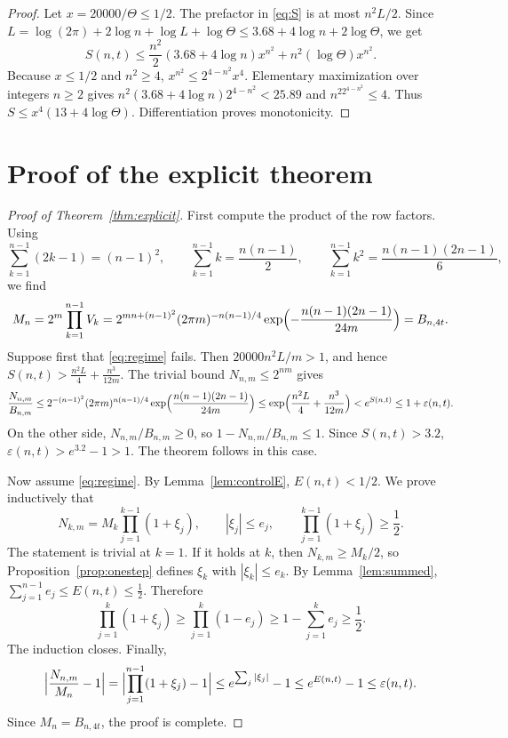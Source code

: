 \documentclass[11pt,reqno]{amsart}
\theoremstyle{plain}
\theoremstyle{definition}
\theoremstyle{remark}
\begin{document}
\begin{proof}
Let \(x=20000/\Theta\le1/2\). The prefactor in \eqref{eq:S} is at most
\(n^2L/2\). Since
\(L=\log(2\pi)+2\log n+\log L+\log\Theta\le3.68+4\log n+2\log\Theta\), we get
\[
  S(n,t)\le\frac{n^2}2(3.68+4\log n)x^{n^2}+n^2(\log\Theta)x^{n^2}.
\]
Because \(x\le1/2\) and \(n^2\ge4\), \(x^{n^2}\le2^{4-n^2}x^4\). Elementary
maximization over integers \(n\ge2\) gives
\(n^2(3.68+4\log n)2^{4-n^2}<25.89\) and \(n^22^{4-n^2}\le4\). Thus
\(S\le x^4(13+4\log\Theta)\). Differentiation proves monotonicity.
\end{proof}

\section{Proof of the explicit theorem}

\begin{proof}[Proof of Theorem~\ref{thm:explicit}]
First compute the product of the row factors. Using
\[
  \sum_{k=1}^{n-1}(2k-1)=(n-1)^2,\qquad
  \sum_{k=1}^{n-1}k=\frac{n(n-1)}2,\qquad
  \sum_{k=1}^{n-1}k^2=\frac{n(n-1)(2n-1)}6,
\]
we find
\[
  M_n=2^m\prod_{k=1}^{n-1}V_k
  =2^{mn+(n-1)^2}(2\pi m)^{-n(n-1)/4}
    \exp\Bigl(-\frac{n(n-1)(2n-1)}{24m}\Bigr)=B_{n,4t}.
\]
Suppose first that \eqref{eq:regime} fails. Then \(20000n^2L/m>1\), and hence
\(S(n,t)>\tfrac{n^2L}4+\tfrac{n^3}{12m}\). The trivial bound
\(N_{n,m}\le2^{nm}\) gives
\[
  \frac{N_{n,m}}{B_{n,m}}\le2^{-(n-1)^2}(2\pi m)^{n(n-1)/4}
    \exp\Bigl(\frac{n(n-1)(2n-1)}{24m}\Bigr)
  \le\exp\Bigl(\frac{n^2L}4+\frac{n^3}{12m}\Bigr)<e^{S(n,t)}
  \le1+\varepsilon(n,t).
\]
On the other side, \(N_{n,m}/B_{n,m}\ge0\), so
\(1-N_{n,m}/B_{n,m}\le1\). Since \(S(n,t)>3.2\),
\(\varepsilon(n,t)>e^{3.2}-1>1\). The theorem follows in this case.

Now assume \eqref{eq:regime}. By Lemma~\ref{lem:controlE},
\(E(n,t)<1/2\). We prove inductively that
\[
  N_{k,m}=M_k\prod_{j=1}^{k-1}(1+\xi_j),\qquad|\xi_j|\le e_j,\qquad
  \prod_{j=1}^{k-1}(1+\xi_j)\ge\frac12.
\]
The statement is trivial at \(k=1\). If it holds at \(k\), then
\(N_{k,m}\ge M_k/2\), so Proposition~\ref{prop:onestep} defines \(\xi_k\) with
\(|\xi_k|\le e_k\). By Lemma~\ref{lem:summed},
\(\sum_{j=1}^{n-1}e_j\le E(n,t)\le\tfrac12\). Therefore
\[
  \prod_{j=1}^k(1+\xi_j)\ge\prod_{j=1}^k(1-e_j)
  \ge1-\sum_{j=1}^ke_j\ge\frac12.
\]
The induction closes. Finally,
\[
  \Bigl|\frac{N_{n,m}}{M_n}-1\Bigr|
  =\Bigl|\prod_{j=1}^{n-1}(1+\xi_j)-1\Bigr|
  \le e^{\sum_j|\xi_j|}-1\le e^{E(n,t)}-1\le\varepsilon(n,t).
\]
Since \(M_n=B_{n,4t}\), the proof is complete.
\end{proof}
\end{document}
